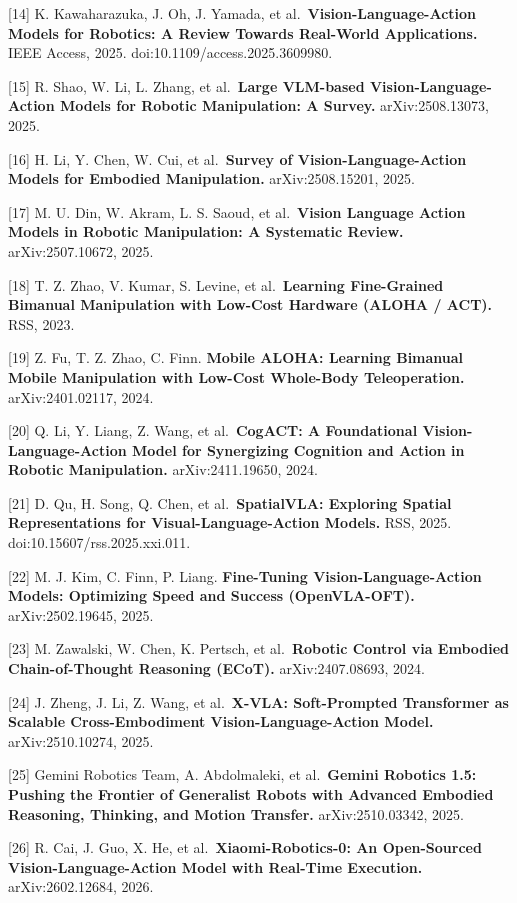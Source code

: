 {[}14{]} K. Kawaharazuka, J. Oh, J. Yamada, et al.~\textbf{Vision-Language-Action Models for Robotics: A Review Towards Real-World Applications.} IEEE Access, 2025. doi:10.1109/access.2025.3609980.

{[}15{]} R. Shao, W. Li, L. Zhang, et al.~\textbf{Large VLM-based Vision-Language-Action Models for Robotic Manipulation: A Survey.} arXiv:2508.13073, 2025.

{[}16{]} H. Li, Y. Chen, W. Cui, et al.~\textbf{Survey of Vision-Language-Action Models for Embodied Manipulation.} arXiv:2508.15201, 2025.

{[}17{]} M. U. Din, W. Akram, L. S. Saoud, et al.~\textbf{Vision Language Action Models in Robotic Manipulation: A Systematic Review.} arXiv:2507.10672, 2025.

{[}18{]} T. Z. Zhao, V. Kumar, S. Levine, et al.~\textbf{Learning Fine-Grained Bimanual Manipulation with Low-Cost Hardware (ALOHA / ACT).} RSS, 2023.

{[}19{]} Z. Fu, T. Z. Zhao, C. Finn. \textbf{Mobile ALOHA: Learning Bimanual Mobile Manipulation with Low-Cost Whole-Body Teleoperation.} arXiv:2401.02117, 2024.

{[}20{]} Q. Li, Y. Liang, Z. Wang, et al.~\textbf{CogACT: A Foundational Vision-Language-Action Model for Synergizing Cognition and Action in Robotic Manipulation.} arXiv:2411.19650, 2024.

{[}21{]} D. Qu, H. Song, Q. Chen, et al.~\textbf{SpatialVLA: Exploring Spatial Representations for Visual-Language-Action Models.} RSS, 2025. doi:10.15607/rss.2025.xxi.011.

{[}22{]} M. J. Kim, C. Finn, P. Liang. \textbf{Fine-Tuning Vision-Language-Action Models: Optimizing Speed and Success (OpenVLA-OFT).} arXiv:2502.19645, 2025.

{[}23{]} M. Zawalski, W. Chen, K. Pertsch, et al.~\textbf{Robotic Control via Embodied Chain-of-Thought Reasoning (ECoT).} arXiv:2407.08693, 2024.

{[}24{]} J. Zheng, J. Li, Z. Wang, et al.~\textbf{X-VLA: Soft-Prompted Transformer as Scalable Cross-Embodiment Vision-Language-Action Model.} arXiv:2510.10274, 2025.

{[}25{]} Gemini Robotics Team, A. Abdolmaleki, et al.~\textbf{Gemini Robotics 1.5: Pushing the Frontier of Generalist Robots with Advanced Embodied Reasoning, Thinking, and Motion Transfer.} arXiv:2510.03342, 2025.

{[}26{]} R. Cai, J. Guo, X. He, et al.~\textbf{Xiaomi-Robotics-0: An Open-Sourced Vision-Language-Action Model with Real-Time Execution.} arXiv:2602.12684, 2026.

